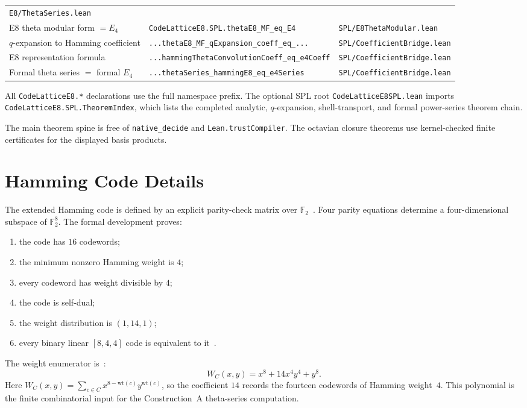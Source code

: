 \documentclass[12pt]{article}
\theoremstyle{definition}
\newcommand{\F}{\mathbb{F}}
\newcommand{\code}[1]{\texttt{#1}}
\newcommand{\lean}[1]{\texttt{#1}}
\begin{document}
\begin{longtable}{@{}p{5.3cm}p{5.4cm}p{3.5cm}@{}}
  \lean{E8/ThetaSeries.lean} \\[2pt]
E8 theta modular form $= E_4$ &
  \lean{CodeLatticeE8.SPL.thetaE8\_MF\_eq\_E4} &
  \lean{SPL/E8ThetaModular.lean} \\[2pt]
$q$-expansion to Hamming coefficient &
  \lean{...thetaE8\_MF\_qExpansion\_coeff\_eq\_...} &
  \lean{SPL/CoefficientBridge.lean} \\[2pt]
E8 representation formula &
  \lean{...hammingThetaConvolutionCoeff\_eq\_e4Coeff} &
  \lean{SPL/CoefficientBridge.lean} \\[2pt]
Formal theta series $=$ formal $E_4$ &
  \lean{...thetaSeries\_hammingE8\_eq\_e4Series} &
  \lean{SPL/CoefficientBridge.lean} \\
\end{longtable}

\noindent
All \lean{CodeLatticeE8.*} declarations use the full namespace prefix.
The optional SPL root \code{CodeLatticeE8SPL.lean} imports
\code{CodeLatticeE8.SPL.TheoremIndex}, which lists the completed analytic,
$q$-expansion, shell-transport, and formal power-series theorem chain.

The main theorem spine is free of \lean{native\_decide} and
\lean{Lean.trustCompiler}.  The octavian closure theorems use kernel-checked
finite certificates for the displayed basis products.

\section{Hamming Code Details}
\label{app:hamming}

The extended Hamming code is defined by an explicit parity-check matrix over
$\F_2$~\cite{Hamming1950,MacSloane1977}.  Four parity equations determine a
four-dimensional subspace of $\F_2^8$.  The formal development proves:
\begin{enumerate}
\item the code has $16$ codewords;
\item the minimum nonzero Hamming weight is $4$;
\item every codeword has weight divisible by $4$;
\item the code is self-dual;
\item the weight distribution is $(1,14,1)$;
\item every binary linear $[8,4,4]$ code is equivalent to it~\cite{MacSloane1977}.
\end{enumerate}

The weight enumerator is~\cite{MacSloane1977}:
\[
  W_C(x,y) = x^8 + 14x^4y^4 + y^8.
\]
Here \(W_C(x,y)=\sum_{c\in C}x^{8-\mathrm{wt}(c)}y^{\mathrm{wt}(c)}\), so the
coefficient \(14\) records the fourteen codewords of Hamming weight~\(4\).
This polynomial is the finite combinatorial input for the Construction~A
theta-series computation.
\end{document}
